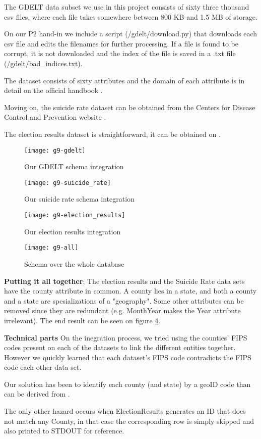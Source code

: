 The GDELT data subset we use in this project consists of sixty
three thousand csv files, where each file takes somewhere between
800 KB and 1.5 MB of storage.

On our P2 hand-in we include a script
(/gdelt/download.py) that downloads each csv file
and edits the filenames for further processing.
If a file is found to be corrupt, it is not downloaded and
the index of the file is saved in a .txt file
(/gdelt/bad\_indices.txt).

The dataset consists of sixty attributes and the domain of
each attribute is in detail on the official handbook
{\color{red}{citation}}.

Moving on, the suicide rate dataset can be obtained from
the Centers for Disease Control and Prevention
website \cite{suicide_website}.

The election results dataset is straightforward, it can be
obtained on {\color{red}{todo}}.

\begin{figure}
	\centering
	\texttt{[image: g9-gdelt]}
	\caption{Our GDELT schema integration}
	\label{fig:gdelt}
\end{figure}

\begin{figure}
	\centering
	\texttt{[image: g9-suicide\_rate]}
	\caption{Our suicide rate schema integration}
	\label{fig:suicide_rate}
\end{figure}

\begin{figure}
	\centering
	\texttt{[image: g9-election\_results]}
	\caption{Our election results integration}
	\label{fig:election_results}
\end{figure}

\begin{figure}
	\centering
	\texttt{[image: g9-all]}
	\caption{Schema over the whole database}
	\label{fig:all}
\end{figure}


\textbf{Putting it all together}:
The election results and the Suicide Rate data sets have the
county attribute in common.
A county lies in a state, and both a county and a state are
spesializations of a "geography".
Some other attributes can be removed since they are redundant
(e.g. MonthYear makes the Year attribute irrelevant).
The end result can be seen on figure \ref{fig:all}.

\textbf{Technical parts}
On the inegration process, we tried using the counties' FIPS codes
present on each of the datasets to link the different entities
together.
However we quickly learned that each dataset's FIPS code
contradicts the FIPS code each other data set.

Our solution has been to identify each county (and state)
by a geoID code than can be derived from {\color{red}{todo
https://community.esri.com/thread/24614
ESRI
}}.

The only other hazard occurs when ElectionResults generates an
ID that does not match any County, in that case the corresponding
row is simply skipped and also printed to STDOUT for reference.
